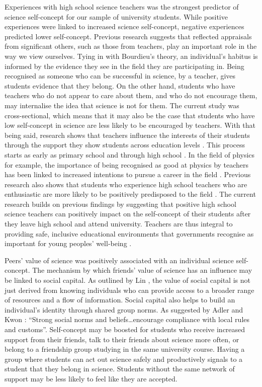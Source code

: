 \documentclass[smallextended]{svjour3}       %
\begin{document}
Experiences with high school science teachers was the strongest predictor of science self-concept for our sample of university students. While positive experiences were linked to increased science self-concept, negative experiences predicted lower self-concept. Previous research suggests that reflected appraisals from significant others, such as those from teachers, play an important role in the way we view ourselves\cite{bong2003academic}. Tying in with Bourdieu's theory, an individual's habitus is informed by the evidence they see in the field they are participating in. Being recognised as someone who can be successful in science, by a teacher, gives students evidence that they belong. On the other hand, students who have teachers who do not appear to care about them, and who do not encourage them, may internalise the idea that science is not for them. The current study was cross-sectional, which means that it may also be the case that students who have low self-concept in science are less likely to be encouraged by teachers. With that being said, research shows that teachers influence the interests of their students through the support they show students across education levels \cite{marjoribanks2006adolescents}. This process starts as early as primary school \cite{fauth2014student} and through high school \cite{marjoribanks2006adolescents,Hazari2017}. In the field of physics for example, the importance of being recognised as good at physics by teachers has been linked to increased intentions to pursue a career in the field \cite{Hazari2017}. Previous research also shows that students who experience high school teachers who are enthusiastic are more likely to be positively predisposed to the field \cite{keller2017impact}. The current research builds on previous findings by suggesting that positive high school science teachers can positively impact on the self-concept of their students after they leave high school and attend university. Teachers are thus integral to providing safe, inclusive educational environments that governments recognise as important for young peoples' well-being \cite{wellbeing2019}. 

Peers' value of science was positively associated with an individual science self-concept. The mechanism by which friends' value of science has an influence may be linked to social capital. As outlined by Lin \citeyear{lin1999building}, the value of social capital is not just derived from knowing individuals who can provide access to a broader range of resources and a flow of information. Social capital also helps to build an individual's identity through shared group norms. As suggested by Adler and Kwon \citeyear[p.29]{Adler2017}: ``Strong social norms and beliefs\ldots encourage compliance with local rules and customs''. Self-concept may be boosted for students who receive increased support from their friends, talk to their friends about science more often, or belong to a friendship group studying in the same university course. Having a group where students can act out science safely and productively signals to a student that they belong in science. Students without the same network of support may be less likely to feel like they are accepted. 
\end{document}
